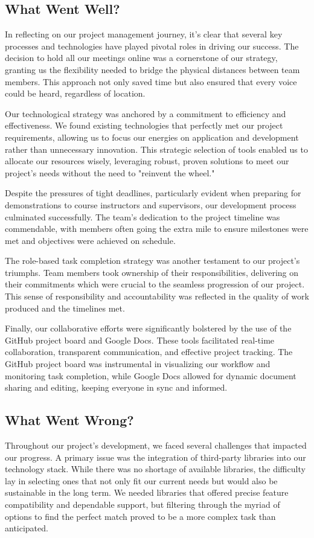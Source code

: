 \documentclass{article}
\begin{document}
\subsection{What Went Well?}
In reflecting on our project management journey, it's clear that several key processes and technologies have played pivotal roles in driving our success. The decision to hold all our meetings online was a cornerstone of our strategy, granting us the flexibility needed to bridge the physical distances between team members. This approach not only saved time but also ensured that every voice could be heard, regardless of location.

Our technological strategy was anchored by a commitment to efficiency and effectiveness. We found existing technologies that perfectly met our project requirements, allowing us to focus our energies on application and development rather than unnecessary innovation. This strategic selection of tools enabled us to allocate our resources wisely, leveraging robust, proven solutions to meet our project's needs without the need to "reinvent the wheel."

Despite the pressures of tight deadlines, particularly evident when preparing for demonstrations to course instructors and supervisors, our development process culminated successfully. The team's dedication to the project timeline was commendable, with members often going the extra mile to ensure milestones were met and objectives were achieved on schedule.

The role-based task completion strategy was another testament to our project's triumphs. Team members took ownership of their responsibilities, delivering on their commitments which were crucial to the seamless progression of our project. This sense of responsibility and accountability was reflected in the quality of work produced and the timelines met.

Finally, our collaborative efforts were significantly bolstered by the use of the GitHub project board and Google Docs. These tools facilitated real-time collaboration, transparent communication, and effective project tracking. The GitHub project board was instrumental in visualizing our workflow and monitoring task completion, while Google Docs allowed for dynamic document sharing and editing, keeping everyone in sync and informed.

\subsection{What Went Wrong?}
Throughout our project's development, we faced several challenges that impacted our progress. A primary issue was the integration of third-party libraries into our technology stack. While there was no shortage of available libraries, the difficulty lay in selecting ones that not only fit our current needs but would also be sustainable in the long term. We needed libraries that offered precise feature compatibility and dependable support, but filtering through the myriad of options to find the perfect match proved to be a more complex task than anticipated.
\end{document}
